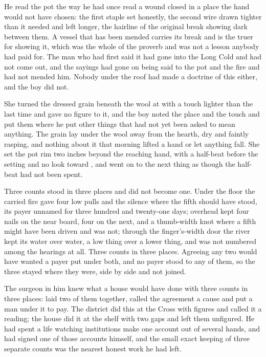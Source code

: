 He read the pot the way he had once read a wound closed in a place the hand would not have chosen: the first staple set honestly, the second wire drawn tighter than it needed and left longer, the hairline of the original break showing dark between them. A vessel that has been mended carries its break and is the truer for showing it, which was the whole of the proverb and was not a lesson anybody had paid for. The man who had first said it had gone into the Long Cold and had not come out, and the sayings had gone on being said to the pot and the fire and had not mended him. Nobody under the roof had made a doctrine of this either, and the boy did not.

She turned the dressed grain beneath the wool at  with a touch lighter than the last time and gave no figure to it, and the boy noted the place and the touch and put them where he put other things that had not yet been asked to mean anything. The grain lay under the wool away from the hearth, dry and faintly rasping, and nothing about it that morning lifted a hand or let anything fall. She set the pot rim two inches beyond the reaching hand, with a half-beat before the setting and no look toward , and went on to the next thing as though the half-beat had not been spent.

\scenebreak

Three counts stood in three places and did not become one. Under the floor the carried fire gave four low pulls and the silence where the fifth should have stood, its payer unnamed for three hundred and twenty-one days; overhead  kept four nails on the near board, four on the next, and a thumb-width knot where a fifth might have been driven and was not; through the finger's-width door the river kept its water over water, a low thing over a lower thing, and was not numbered among the hearings at all. Three counts in three places. Agreeing any two would have wanted a payer put under both, and no payer stood to any of them, so the three stayed where they were, side by side and not joined.

The surgeon in him knew what a house would have done with three counts in three places: laid two of them together, called the agreement a cause and put a man under it to pay. The district did this at the Cross with figures and called it a reading; the house did it at the shelf with two gaps and left them unfigured. He had spent a life watching institutions make one account out of several hands, and had signed one of those accounts himself, and the small exact keeping of three separate counts was the nearest honest work he had left.

